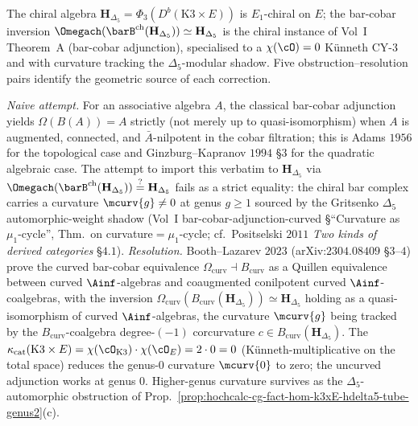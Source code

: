 The chiral algebra $\mathbf H_{\Delta_5}=\Phi_3(D^b(\mathrm K3\times E))$ is
$E_1$-chiral on $E$; the bar-cobar inversion $\Omegach(\barB^{\mathrm{ch}}(\mathbf
H_{\Delta_5}))\simeq\mathbf H_{\Delta_5}$ is the chiral instance of Vol~I
Theorem~A (bar-cobar adjunction), specialised to a $\chi(\cO)=0$
K\"unneth CY-$3$ and with curvature tracking the $\Delta_5$-modular
shadow. Five obstruction--resolution pairs identify the geometric source of each correction.

\begin{proposition}
\label{prop:hochcalc-hdelta5-inversion-I}
\emph{Naive attempt.} For an associative algebra $A$, the classical
bar-cobar adjunction yields $\Omega(B(A))=A$ strictly (not merely
up to quasi-isomorphism) when $A$ is augmented, connected, and
$\bar A$-nilpotent in the cobar filtration; this is Adams $1956$
for the topological case and Ginzburg--Kapranov $1994$ \S$3$ for
the quadratic algebraic case. The attempt to import this verbatim
to $\mathbf H_{\Delta_5}$ via
$\Omegach(\barB^{\mathrm{ch}}(\mathbf H_{\Delta_5}))\overset?=\mathbf H_{\Delta_5}$
fails as a strict equality: the chiral bar complex carries a
curvature $\mcurv{g}\ne 0$ at genus $g\ge 1$ sourced by the
Gritsenko $\Delta_5$ automorphic-weight shadow
(Vol~I bar-cobar-adjunction-curved \S ``Curvature as $\mu_1$-cycle'',
Thm.\ on curvature$=\mu_1$-cycle; cf.\ Positselski $2011$
\emph{Two kinds of derived categories} \S$4.1$). \emph{Resolution.}
Booth--Lazarev $2023$ (arXiv:$2304.08409$ \S$3$--$4$) prove the
curved bar-cobar equivalence
$\Omega_{\mathrm{curv}}\!\dashv B_{\mathrm{curv}}$ as a Quillen
equivalence between curved $\Ainf$-algebras and coaugmented
conilpotent curved $\Ainf$-coalgebras, with the inversion
$\Omega_{\mathrm{curv}}(B_{\mathrm{curv}}(\mathbf H_{\Delta_5}))
\simeq\mathbf H_{\Delta_5}$ holding as a quasi-isomorphism of
curved $\Ainf$-algebras, the curvature $\mcurv{g}$ being tracked
by the $B_{\mathrm{curv}}$-coalgebra degree-$(-1)$ corcurvature
$c\in B_{\mathrm{curv}}(\mathbf H_{\Delta_5})$. The
$\kappa_{\mathrm{cat}}(\mathrm K3\times E)=\chi(\cO_{\mathrm
K3})\cdot\chi(\cO_E)=2\cdot 0=0$ (K\"unneth-multiplicative on the total space)
reduces the genus-$0$ curvature $\mcurv{0}$ to zero; the uncurved
adjunction works at genus $0$. Higher-genus curvature survives as
the $\Delta_5$-automorphic obstruction of
Prop.~\ref{prop:hochcalc-cg-fact-hom-k3xE-hdelta5-tube-genus2}(c).
\end{proposition}

